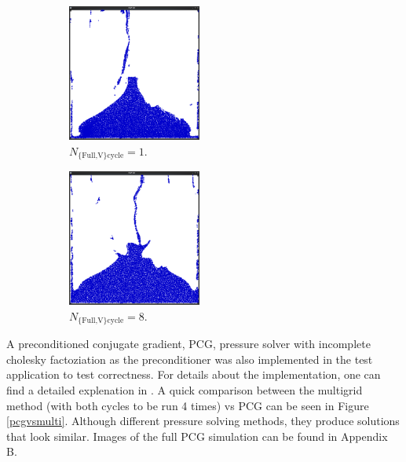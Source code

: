 \begin{figure}[ht!]
\centering
\begin{subfigure}[]{0.3\textwidth}
\includegraphics[height=45mm]{png/multigridN1.png}
\caption{$N_{\text{\{Full,V\} cycle}} = 1$.}
\end{subfigure}
\begin{subfigure}[]{0.3\textwidth}
\includegraphics[height=45mm]{png/multigridN8.png}
\caption{$N_{\text{\{Full,V\} cycle}} = 8$.}
\end{subfigure}
\caption{}
\label{lowvshigh}
\end{figure}

A preconditioned conjugate gradient, PCG, pressure solver with incomplete cholesky factoziation as the preconditioner was also implemented in the test application to test correctness. For details about the implementation, one can find a detailed explenation in \cite{bridson}. A quick comparison between the multigrid method (with both cycles to be run 4 times) vs PCG can be seen in Figure \ref{pcgvsmulti}. Although different pressure solving methods, they produce solutions that look similar. Images of the full PCG simulation can be found in Appendix B. 

